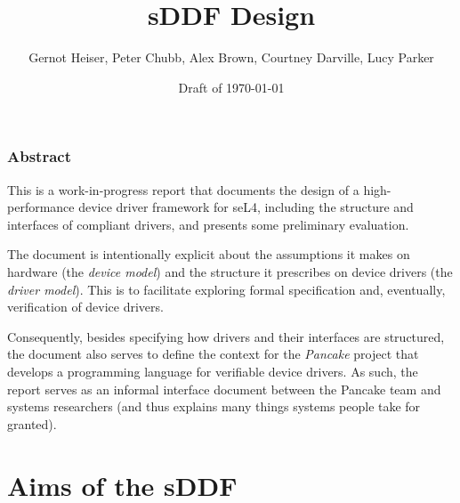 \documentclass[a4paper,12pt]{report}
\renewcommand{\lstlistoflistings}{\begingroup
    \tocfile{List of Listings}{lol}
\endgroup}
\begin{document}
\newcommand{\lstnumberautorefname}{Line}
\renewcommand{\chapterautorefname}{Chapter}
\renewcommand{\sectionautorefname}{Section}
\renewcommand{\subsectionautorefname}{Section}
\renewcommand{\subsubsectionautorefname}{Section}
\renewcommand{\appendixautorefname}{Appendix}
\renewcommand{\Hfootnoteautorefname}{Footnote}

\setcounter{topnumber}{2}
\renewcommand{\topfraction}{0.91}


\title{sDDF Design}
\author{Gernot Heiser, Peter Chubb, Alex Brown, Courtney Darville, Lucy Parker}
\date{\ifDraft Draft of \today\else \Release\fi}
\maketitle

\subsection*{Abstract}

This is a work-in-progress report that documents the design of a
high-performance device driver framework for seL4, including the
structure and interfaces of compliant drivers, and presents some
preliminary evaluation.

The document is intentionally explicit about the assumptions it makes on
hardware (the \emph{device model}) and the structure it prescribes on
device drivers (the \emph{driver model}). This is to
facilitate exploring formal specification and, eventually,
verification of device drivers.

Consequently, besides specifying how drivers and their interfaces are
structured, the document also serves to define the context for the
\emph{Pancake} project that develops a programming language for
verifiable device drivers. As such, the report serves as an informal
interface document between the Pancake team and systems researchers
(and thus explains many things systems people take for granted).

\tableofcontents
\listoffigures
\lstlistoflistings
\printnoidxglossaries

\chapter{Aims of the sDDF}\label{s:aims}
\end{document}
